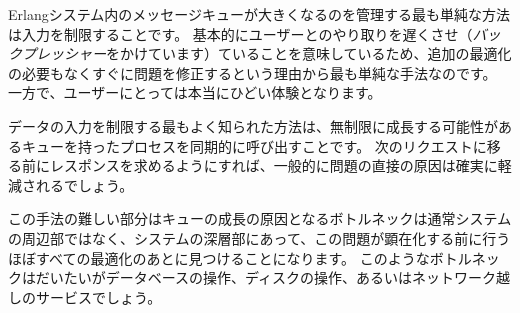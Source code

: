 Erlangシステム内のメッセージキューが大きくなるのを管理する最も単純な方法は入力を制限することです。
基本的にユーザーとのやり取りを遅くさせ（\emph{バックプレッシャー}をかけています）ていることを意味しているため、追加の最適化の必要もなくすぐに問題を修正するという理由から最も単純な手法なのです。
一方で、ユーザーにとっては本当にひどい体験となります。

データの入力を制限する最もよく知られた方法は、無制限に成長する可能性があるキューを持ったプロセスを同期的に呼び出すことです。
次のリクエストに移る前にレスポンスを求めるようにすれば、一般的に問題の直接の原因は確実に軽減されるでしょう。

この手法の難しい部分はキューの成長の原因となるボトルネックは通常システムの周辺部ではなく、システムの深層部にあって、この問題が顕在化する前に行うほぼすべての最適化のあとに見つけることになります。
このようなボトルネックはだいたいがデータベースの操作、ディスクの操作、あるいはネットワーク越しのサービスでしょう。

